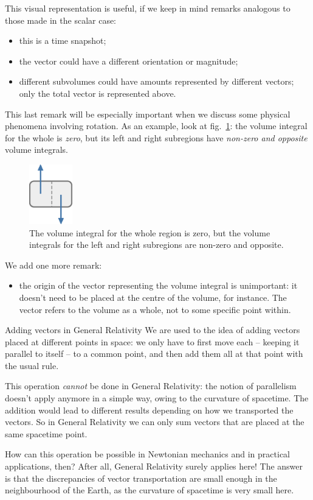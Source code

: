\documentclass[a4paper,12pt,%
onecolumn,oneside,titlepage,%
british%
]{memoir}
\renewcommand*{\|}[1][]{\nonscript\:#1\vert\nonscript\:\mathopen{}}
\newcommand*{\fig}{fig.}%
\begin{document}
This visual representation is useful, if we keep in mind remarks analogous to those made in the scalar case:
\begin{itemize}
\item this is a time snapshot; 
\item the vector could have a different orientation or magnitude; 
\item different subvolumes could have amounts represented by different vectors; only the total vector is represented above.
\end{itemize}
This last remark will be especially important when we discuss some physical phenomena involving rotation. As an example, look at \fig~\ref{fig:nonzero_vector_subregions}: the volume integral for the whole is \emph{zero}, but its left and right subregions have \emph{non-zero and opposite} volume integrals.
\begin{figure}[h]\centering
  \includegraphics[height=7em]{volumeintegral_N_divided.pdf}
  \caption{The volume integral for the whole region is zero, but the volume integrals for the left and right subregions are non-zero and opposite.}\label{fig:nonzero_vector_subregions}
\end{figure}

We add one more remark:
\begin{itemize}
\item the origin of the vector representing the volume integral is unimportant: it doesn't need to be placed at the centre of the volume, for instance. The vector refers to the volume as a whole, not to some specific point within.
\end{itemize}

\smallskip

\begin{extra}{Adding vectors in General Relativity}
 We are used to the idea of adding vectors placed at different points in space: we only have to first move each -- keeping it parallel to itself -- to a common point, and then add them all at that point with the usual rule.

  This operation \emph{cannot} be done in General Relativity: the notion of parallelism doesn't apply anymore in a simple way, owing to the curvature of spacetime. The addition would lead to different results depending on how we transported the vectors. So in General Relativity we can only sum vectors that are placed at the same spacetime point.

  How can this operation be possible in Newtonian mechanics and in practical applications, then? After all, General Relativity surely applies here! The answer is that the discrepancies of vector transportation are small enough in the neighbourhood of the Earth, as the curvature of spacetime is very small here.
\end{extra}
\end{document}
